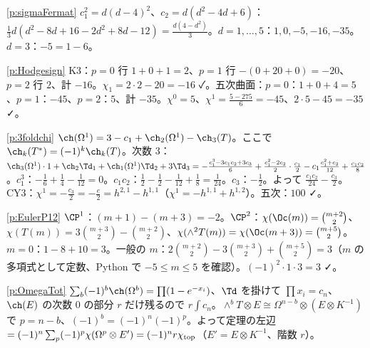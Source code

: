\begin{sol}{\ref{p:sigmaFermat}}
$c_1^2=d(d-4)^2$、$c_2=d(d^2-4d+6)$：$\frac13d(d^2-8d+16-2d^2+8d-12)=\frac{d(4-d^2)}3$。$d=1,\dots,5$：$1,0,-5,-16,-35$。$d=3$：$-5=1-6$。
\end{sol}
\begin{sol}{\ref{p:Hodgesign}}
K3：$p=0$ 行 $1+0+1=2$、$p=1$ 行 $-(0+20+0)=-20$、$p=2$ 行 $2$、計 $-16$。$\chi_1=2\cdot2-20=-16$ ✓。五次曲面：$p=0$：$1+0+4=5$、$p=1$：$-45$、$p=2$：$5$、計 $-35$。$\chi^0=5$、$\chi^1=\frac{5-275}6=-45$、$2\cdot5-45=-35$ ✓。
\end{sol}
\begin{sol}{\ref{p:3foldchi}}
$\ch(\Omega^1)=3-c_1+\ch_2(\Omega^1)-\ch_3(T)$。ここで $\ch_k(T^*)=(-1)^k\ch_k(T)$。次数 3：$\ch_3(\Omega^1)\cdot1+\ch_2\Td_1+\ch_1(\Omega^1)\Td_2+3\Td_3=-\frac{c_1^3-3c_1c_2+3c_3}6+\frac{c_1^2-2c_2}2\cdot\frac{c_1}2-c_1\frac{c_1^2+c_2}{12}+\frac{c_1c_2}8$。$c_1^3$：$-\frac16+\frac14-\frac1{12}=0$。$c_1c_2$：$\frac12-\frac12-\frac1{12}+\frac18=\frac1{24}$。$c_3$：$-\frac12$。よって $\frac{c_1c_2}{24}-\frac{c_3}2$。CY3：$\chi^1=-\frac{c_3}2=-\frac e2=h^{2,1}-h^{1,1}$（$\chi^1=-h^{1,1}+h^{1,2}$）。五次：$100$ ✓。
\end{sol}
\begin{sol}{\ref{p:EulerP12}}
$\CP^1$：$(m+1)-(m+3)=-2$。$\CP^2$：$\chi(\Oc(m))=\binom{m+2}2$、$\chi(T(m))=3\binom{m+3}2-\binom{m+2}2$、$\chi(\wedge^2T(m))=\chi(\Oc(m+3))=\binom{m+5}2$。$m=0$：$1-8+10=3$。一般の $m$：$2\binom{m+2}2-3\binom{m+3}2+\binom{m+5}2=3$（$m$ の多項式として定数、Python で $-5\le m\le5$ を確認）。$(-1)^2\cdot1\cdot3=3$ ✓。
\end{sol}
\begin{sol}{\ref{p:OmegaTot}}
$\sum_b(-1)^b\ch(\Omega^b)=\prod(1-e^{-x_i})$、$\Td$ を掛けて $\prod x_i=c_n$、$\ch(E)$ の次数 $0$ の部分 $r$ だけ残るので $r\int c_n$。$\wedge^bT\otimes E\cong\Omega^{n-b}\otimes(E\otimes K^{-1})$ で $p=n-b$、$(-1)^b=(-1)^n(-1)^p$。よって定理の左辺 $=(-1)^n\sum_p(-1)^p\chi(\Omega^p\otimes E')=(-1)^nr\chi_{\rm top}$（$E'=E\otimes K^{-1}$、階数 $r$）。
\end{sol}



